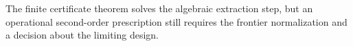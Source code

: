 The finite certificate theorem solves the algebraic extraction step, but an operational second-order prescription still requires the frontier normalization and a decision about the limiting design.